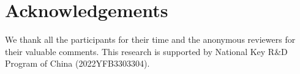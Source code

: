 \documentclass{dsj}
\begin{document}
\section{Acknowledgements}
We thank all the participants for their time and the anonymous reviewers for their valuable comments. This research is supported by National Key R\&D Program of China (2022YFB3303304).

\end{document}
